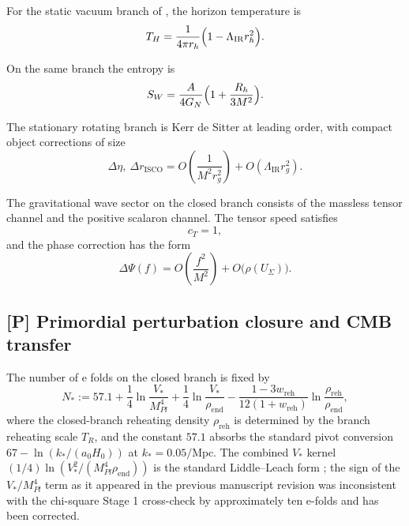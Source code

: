 \begin{conjecture}
\label{cor:hawking_temperature_stationary_branch}
For the static vacuum branch of
, the horizon temperature is
\[
T_H=\frac{1}{4\pi r_h}\Bigl(1-\Lambda_{\mathrm{IR}}r_h^2\Bigr).
\]
\end{conjecture}

\begin{conjecture}
\label{prop:wald_entropy_scalaron_branch}
On the same branch the entropy is
\[
S_W=\frac{A}{4G_N}\Bigl(1+\frac{R_h}{3M^2}\Bigr).
\]
\end{conjecture}

\begin{conjecture}
\label{prop:kerr_compact_object_corrections}
The stationary rotating branch is Kerr de Sitter at leading order, with compact object corrections
of size
\[
\Delta\eta,\ \Delta r_{\mathrm{ISCO}}
=
O\!\left(\frac{1}{M^2r_g^2}\right)+O(\Lambda_{\mathrm{IR}}r_g^2).
\]
\end{conjecture}

\begin{conjecture}
\label{thm:tensor_scalaron_wave_channel_closure}
The gravitational wave sector on the closed branch consists of the massless tensor channel and the
positive scalaron channel. The tensor speed satisfies
\[
c_T=1,
\]
and the phase correction has the form
\[
\Delta\Psi(f)=O\!\left(\frac{f^2}{M^2}\right)+O\bigl(\rho(U_\Sigma)\bigr).
\]
\end{conjecture}

\subsection{[P] Primordial perturbation closure and CMB transfer}

\begin{conjecture}
\label{thm:reheating_fixed_efolds}
The number of e folds on the closed branch is fixed by
\[
N_*
:=
57.1
+\frac14\ln\frac{V_*}{M_{Pl}^4}
+\frac14\ln\frac{V_*}{\rho_{\mathrm{end}}}
-\frac{1-3w_{\mathrm{reh}}}{12(1+w_{\mathrm{reh}})}
\ln\frac{\rho_{\mathrm{reh}}}{\rho_{\mathrm{end}}},
\]
where the closed-branch reheating density $\rho_{\mathrm{reh}}$ is determined by the branch
reheating scale $T_R$, and the constant $57.1$ absorbs the standard pivot conversion
$67-\ln(k_*/(a_0H_0))$ at $k_*=0.05/\mathrm{Mpc}$. The combined $V_*$ kernel
$(1/4)\ln(V_*^2/(M_{Pl}^4\rho_{\mathrm{end}}))$ is the standard Liddle--Leach form
\cite{LiddleLeach2003}; the sign of the $V_*/M_{Pl}^4$ term as it appeared in the previous
manuscript revision was inconsistent with the chi-square Stage 1 cross-check by approximately ten
e-folds and has been corrected.
\end{conjecture}

